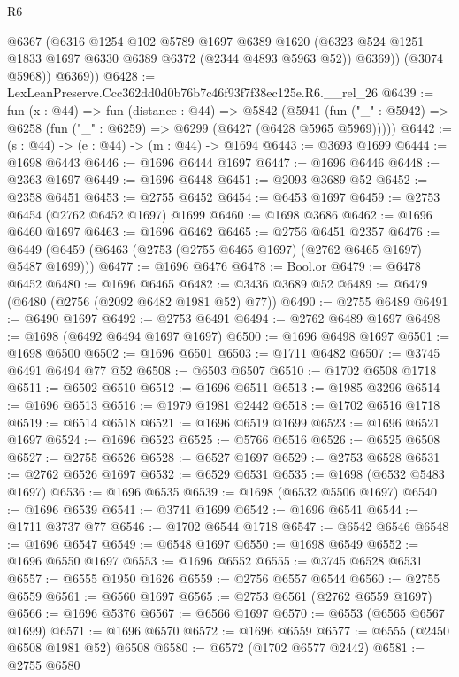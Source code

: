 \begin{lexlean}{R6}
\begin{coremodule}
            @6367
            (@6316
              @1254
              @102
              @5789
              @1697
              @6389
              @1620
              (@6323 @524 @1251 @1833 @1697 @6330 @6389 @6372 (@2344 @4893 @5963 @52))
              @6369))
          (@3074 @5968))
        @6369))
@6428 := LexLeanPreserve.Ccc362dd0d0b76b7c46f93f7f38ec125e.R6.__rel_26
@6439 := fun (x : @44) =>
  fun (distance : @44) =>
  @5842
    (@5941 (fun ("_" : @5942) => @6258 (fun ("_" : @6259) => @6299 (@6427 (@6428 @5965 @5969)))))
@6442 := (s : @44) -> (e : @44) -> (m : @44) -> @1694
@6443 := @3693 @1699
@6444 := @1698 @6443
@6446 := @1696 @6444 @1697
@6447 := @1696 @6446
@6448 := @2363 @1697
@6449 := @1696 @6448
@6451 := @2093 @3689 @52
@6452 := @2358 @6451
@6453 := @2755 @6452
@6454 := @6453 @1697
@6459 := @2753 @6454 (@2762 @6452 @1697) @1699
@6460 := @1698 @3686
@6462 := @1696 @6460 @1697
@6463 := @1696 @6462
@6465 := @2756 @6451 @2357
@6476 := @6449 (@6459 (@6463 (@2753 (@2755 @6465 @1697) (@2762 @6465 @1697) @5487 @1699)))
@6477 := @1696 @6476
@6478 := Bool.or
@6479 := @6478 @6452
@6480 := @1696 @6465
@6482 := @3436 @3689 @52
@6489 := @6479 (@6480 (@2756 (@2092 @6482 @1981 @52) @77))
@6490 := @2755 @6489
@6491 := @6490 @1697
@6492 := @2753 @6491
@6494 := @2762 @6489 @1697
@6498 := @1698 (@6492 @6494 @1697 @1697)
@6500 := @1696 @6498 @1697
@6501 := @1698 @6500
@6502 := @1696 @6501
@6503 := @1711 @6482
@6507 := @3745 @6491 @6494 @77 @52
@6508 := @6503 @6507
@6510 := @1702 @6508 @1718
@6511 := @6502 @6510
@6512 := @1696 @6511
@6513 := @1985 @3296
@6514 := @1696 @6513
@6516 := @1979 @1981 @2442
@6518 := @1702 @6516 @1718
@6519 := @6514 @6518
@6521 := @1696 @6519 @1699
@6523 := @1696 @6521 @1697
@6524 := @1696 @6523
@6525 := @5766 @6516
@6526 := @6525 @6508
@6527 := @2755 @6526
@6528 := @6527 @1697
@6529 := @2753 @6528
@6531 := @2762 @6526 @1697
@6532 := @6529 @6531
@6535 := @1698 (@6532 @5483 @1697)
@6536 := @1696 @6535
@6539 := @1698 (@6532 @5506 @1697)
@6540 := @1696 @6539
@6541 := @3741 @1699
@6542 := @1696 @6541
@6544 := @1711 @3737 @77
@6546 := @1702 @6544 @1718
@6547 := @6542 @6546
@6548 := @1696 @6547
@6549 := @6548 @1697
@6550 := @1698 @6549
@6552 := @1696 @6550 @1697
@6553 := @1696 @6552
@6555 := @3745 @6528 @6531
@6557 := @6555 @1950 @1626
@6559 := @2756 @6557 @6544
@6560 := @2755 @6559
@6561 := @6560 @1697
@6565 := @2753 @6561 (@2762 @6559 @1697)
@6566 := @1696 @5376
@6567 := @6566 @1697
@6570 := @6553 (@6565 @6567 @1699)
@6571 := @1696 @6570
@6572 := @1696 @6559
@6577 := @6555 (@2450 @6508 @1981 @52) @6508
@6580 := @6572 (@1702 @6577 @2442)
@6581 := @2755 @6580

\end{coremodule}
\end{lexlean}
